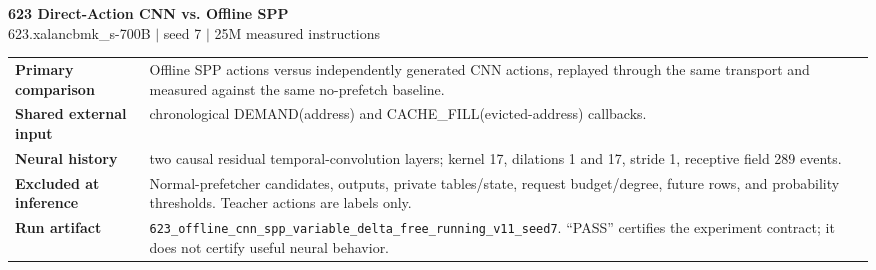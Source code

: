 \documentclass[10pt]{article}
\begin{document}
\begin{center}
{\LARGE\bfseries\color{navy} 623 Direct-Action CNN vs. Offline SPP}\\[2pt]
{\small 623.xalancbmk\_s-700B \quad $\vert$ \quad seed 7 \quad $\vert$ \quad 25M measured instructions}\\[4pt]
\quad
{}
\end{center}

\begin{infobox}
\begin{tabularx}{\textwidth}{@{}>{\bfseries}lX@{}}
Primary comparison & Offline SPP actions versus independently generated CNN actions, replayed through the same transport and measured against the same no-prefetch baseline.\\
Shared external input & chronological DEMAND(address) and CACHE\_FILL(evicted-address) callbacks.\\
Neural history & two causal residual temporal-convolution layers; kernel 17, dilations 1 and 17, stride 1, receptive field 289 events.\\
Excluded at inference & Normal-prefetcher candidates, outputs, private tables/state, request budget/degree, future rows, and probability thresholds.  Teacher actions are labels only.\\
Run artifact & \texttt{623\_offline\_cnn\_spp\_variable\_delta\_free\_running\_v11\_seed7}.  ``PASS'' certifies the experiment contract; it does not certify useful neural behavior.\\
\end{tabularx}
\end{infobox}
\end{document}
